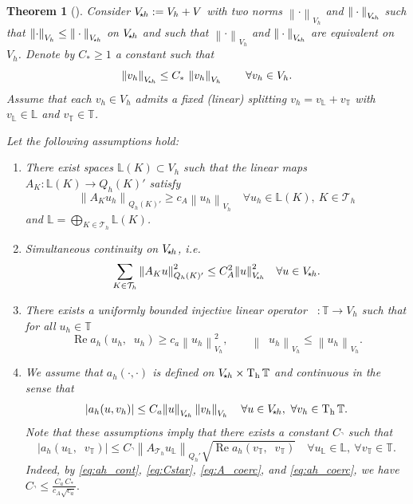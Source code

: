 \documentclass[11pt]{article}
\theoremstyle{definition}
\theoremstyle{plain}
\newtheorem{theorem}{Theorem}[section]
\newcommand{\CA}{C_A}
\newcommand{\Ca}{C_a}
\newcommand{\ca}{c_a}
\newcommand{\cA}{c_A}
\newcommand{\CD}{C_*}
\newcommand{\CT}{C_\urcorner}
\newcommand{\Vsh}{V_{\!\star \hspace*{-0.2mm}h}}
\newcommand{\dgnorm}[1]{\norm{#1}_{V_h}}
\newcommand{\tdgnorm}[1]{{\Vert#1\Vert}_{\Vsh}}
\newcommand{\Th}{{\calT_h}}
\newcommand{\AK}{{A_K}}
\newcommand{\ILh}{\mathbb{L}}
\newcommand{\LKh}{\mathbb{L}(K)}
\newcommand{\QKh}{Q_h(K)}
\newcommand{\Qh}{Q_h}
\newcommand{\ATh}{A_{\Th}}
\renewcommand{\Re}{\operatorname{Re}}
\DeclareMathOperator{\tch}{T_h}
\newcommand*{\norm}[1]{\left\|#1\right\|}
\newcommand{\IL}{\mathbb{L}}
\newcommand{\IT}{\mathbb{T}}
\newcommand{\ITh}{\mathbb{T}}
\newcommand{\calT}{\mathcal{T}}
\begin{document}
\newcommand{\cea}{\rm{cea}}
\begin{theorem}[{\cite[\S 2.5]{LLSV_ARXIV_2024}}] \label{cor:cea}
Consider $\Vsh := V_h + V$ with two norms $\dgnorm{\cdot}$ and $\tdgnorm{\cdot}$ such that
$\dgnorm{\cdot}\leq \tdgnorm{\cdot}$ on $\Vsh$ and such that $\dgnorm{\cdot}$ and $\tdgnorm{\cdot}$ are equivalent on $V_h$.
Denote by $\CD\geq 1$ a constant such that
\begin{equation}\label{eq:Cstar}
  \tdgnorm{v_h}\le \CD\,\dgnorm{v_h}\qquad\forall v_h\in V_h.
\end{equation}
Assume that each $v_h\in V_h$ admits a fixed (linear) splitting $v_h=v_\IL+v_\IT$ with $v_\IL\in\ILh$ and $v_\IT\in\ITh$.


Let the following assumptions hold:
\begin{enumerate}[label=\roman*)]
\item There exist spaces $\LKh \subset V_h$ such that the linear maps
$\AK : \LKh \to \QKh'$ satisfy
\begin{equation}\label{eq:A_coerc}
    \norm{\AK  u_h }_{\QKh'} \geq \cA \dgnorm{u_h}
    \quad \forall u_h \in \ILh(K),\ K\in\Th
\end{equation} and $\IL = \bigoplus_{K\in \Th} \IL(K)$.
\item Simultaneous continuity on $\Vsh$, i.e.
\begin{equation}\label{eq:A_cont}
    \sum_{K\in\Th} \norm{\AK  u }_{\QKh'}^2 \leq \CA^2 \tdgnorm{u}^2
    \quad \forall u\in \Vsh.
\end{equation}
\item There exists a uniformly bounded injective linear operator $\tch:\ITh \to V_h$ such that for all $u_h\in \ITh$
\begin{equation}\label{eq:ah_coerc}
        \Re a_h(u_h,\tch u_h) \geq \ca \dgnorm{u_h}^2,
        \qquad
        \dgnorm{\tch u_h}\leq \dgnorm{u_h}.
\end{equation}
\item We assume that $a_h(\cdot,\cdot)$ is defined on $\Vsh \times \tch \ITh$ and continuous in the sense that
\begin{equation}\label{eq:ah_cont}
    |a_h(u,v_h)| \leq \Ca \tdgnorm{u} \dgnorm{v_h}
    \quad \forall u\in \Vsh,\ \forall v_h\in \tch \ITh.
\end{equation}
Note that these assumptions imply that there exists a constant $\CT$ such that
\begin{equation}\label{eq:CT_cont}
    |a_h(u_\IL,\tch v_\IT)|
    \leq \CT \norm{\ATh u_\IL}_{\Qh'} \sqrt{\Re a_h(v_\IT,\tch v_\IT)}
    \quad \forall u_\IL\in \ILh,\ \forall v_\IT\in \ITh.
\end{equation}
Indeed, by \eqref{eq:ah_cont}, \eqref{eq:Cstar}, \eqref{eq:A_coerc}, and \eqref{eq:ah_coerc},
we have 
$
\CT \le \frac{\Ca\,\CD}{\cA\sqrt{\ca}}.
$
\end{enumerate}


\end{theorem}
\end{document}
